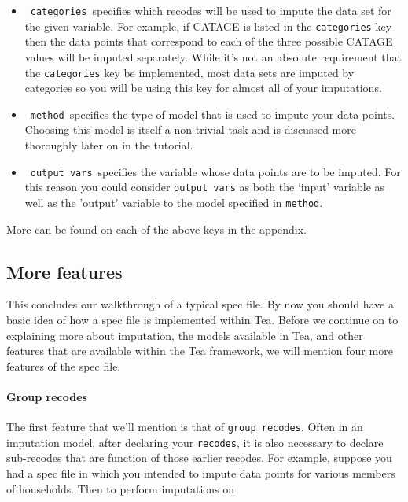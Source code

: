 \documentclass{article}
\begin{document}
\begin{itemize}
\item \ {\tt categories}\  specifies which recodes will be used to impute the data set for 
the given variable. For example, if CATAGE is listed in the {\tt categories} key then the 
data points that correspond to each of the three possible CATAGE values will be imputed 
separately. While it's not an absolute requirement that the {\tt categories} key be implemented, most data 
sets are imputed by categories so you will be using this key for almost all of your imputations.\\
\item \ {\tt method}\ specifies the type of model that is used to impute your data points. 
Choosing this model is itself a non-trivial task and is discussed more thoroughly later on 
in the tutorial.\\
\item \ {\tt output vars}\ specifies the variable whose data points are to be imputed. For this reason 
you could consider {\tt output vars} as both the `input' variable as well as the 'output' variable 
to the model specified in {\tt method}.\\
\end{itemize}
More can be found on each of the above keys in the appendix.

\subsection{More features}
This concludes our walkthrough of a typical spec file. By now you should have a basic idea of 
how a spec file is implemented within Tea. Before we continue on to explaining more about imputation, 
the models available in Tea, and other features that are available within the Tea framework, we will mention 
four more features of the spec file.


\paragraph{Group recodes} The first feature that we'll mention is that of {\tt group recodes}. 
Often in an imputation model, after declaring your {\tt recodes}, it is also necessary to declare 
sub-recodes that are function of those earlier recodes. For example, suppose you had a spec file 
in which you intended to impute data points for various members of households. Then to perform imputations 
on 
\end{document}
